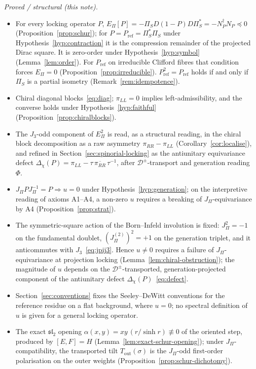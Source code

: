 \documentclass[11pt]{article}
\theoremstyle{definition}
\newcommand{\EPi}{E_\Pi}
\newcommand{\PiS}{\Pi_S}
\newcommand{\Deff}{\mathcal D}
\begin{document}
    \noindent\emph{Proved / structural (this note).}
    \begin{itemize}
      \item For every locking operator $P$, $\EPi[P]=-\PiS D(1-P)D\PiS^{*}=-N_P^{\dagger}N_P\preceq0$
      (Proposition~\ref{prop:schur}); for $P=P_{\mathrm{ref}}=\PiS^{*}\PiS$ under Hypothesis~\ref{hyp:contraction} it is
      the compression remainder of the projected Dirac square.
      It is zero-order under Hypothesis~\ref{hyp:symbol} (Lemma~\ref{lem:order}).
      For $P_{\mathrm{ref}}$ on irreducible Clifford fibres that condition forces $\EPi=0$
      (Proposition~\ref{prop:irreducible}).
      $P_{\mathrm{ref}}^2=P_{\mathrm{ref}}$ holds if and only if $\PiS$ is a partial isometry
      (Remark~\ref{rem:idempotence}).
      \item Chiral diagonal blocks~\eqref{eq:diag}; $\pi_{LL}=0$ implies left-admissibility, and the converse holds
      under Hypothesis~\ref{hyp:faithful} (Proposition~\ref{prop:chiralblocks}).
      \item The $J_3$-odd component of $\EPi^2$ is read, as a structural reading, in the chiral block decomposition as
      a raw asymmetry $\pi_{RR}-\pi_{LL}$ (Corollary~\ref{cor:localise}), and refined in
      Section~\ref{sec:spinorial-locking} as the antiunitary equivariance defect
      $\Delta_\chi(P)=\pi_{LL}-\tau\,\overline{\pi_{RR}}\,\tau^{-1}$, after $\Deff^{\pm}$-transport and
      generation reading $\Phi$.
      \item $J_\Pi PJ_\Pi^{-1}=P\Rightarrow u=0$ under Hypothesis~\ref{hyp:generation}; on the interpretive reading of
      axioms
      A1--A4, a
      non-zero $u$ requires a breaking of $J_\Pi$-equivariance by A4 (Proposition~\ref{prop:strat}).
      \item The symmetric-square action of the Born--Infeld involution is fixed: $J_\Pi^2=-1$ on the
      fundamental doublet, $(J_\Pi^{(2)})^2=+1$ on the generation triplet, and it anticommutes with
      $J_3$~\eqref{eq:jpij3}.
      Hence $u\neq0$ requires a failure of $J_\Pi$-equivariance at projection locking
      (Lemma~\ref{lem:chiral-obstruction}); the magnitude of $u$ depends on the $\Deff^{\pm}$-transported,
      generation-projected component of the antiunitary defect $\Delta_\chi(P)$~\eqref{eq:defect}.
      \item Section~\ref{sec:conventions} fixes the Seeley--DeWitt conventions for the reference residue on a flat
      background, where $u=0$; no spectral definition of $u$ is given for a general locking operator.
      \item The exact $\mathfrak{sl}_2$ opening $\alpha(x,y)=xy\,(r/\sinh r)\not\equiv0$ of the oriented step, produced
      by $[E,F]=H$ (Lemma~\ref{lem:exact-schur-opening}); under $J_\Pi$-compatibility, the transported tilt
      $T_{\mathrm{out}}(\sigma)$ is the $J_\Pi$-odd first-order polarisation on the outer weights
      (Proposition~\ref{prop:schur-dichotomy}).
    \end{itemize}
\end{document}

